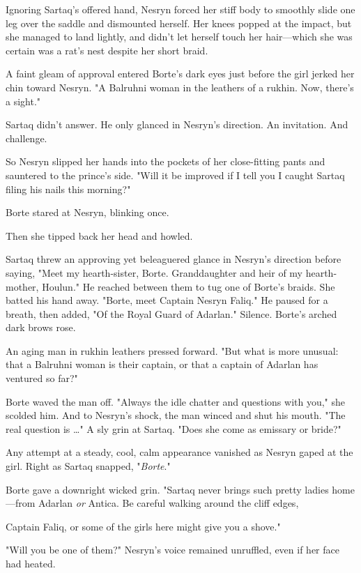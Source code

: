 Ignoring Sartaq's offered hand, Nesryn forced her stiff body to smoothly slide one leg over the saddle and dismounted herself.
Her knees popped at the impact, but she managed to land lightly, and didn't let herself touch her hair---which she was certain was a rat's nest despite her short braid.

A faint gleam of approval entered Borte's dark eyes just before the girl jerked her chin toward Nesryn.
"A Balruhni woman in the leathers of a rukhin.
Now, there's a sight."

Sartaq didn't answer.
He only glanced in Nesryn's direction.
An invitation.
And challenge.

So Nesryn slipped her hands into the pockets of her close-fitting pants and sauntered to the prince's side.
"Will it be improved if I tell you I caught Sartaq filing his nails this morning?"

Borte stared at Nesryn, blinking once.

Then she tipped back her head and howled.

Sartaq threw an approving yet beleaguered glance in Nesryn's direction before saying, "Meet my hearth-sister, Borte.
Granddaughter and heir of my hearth-mother, Houlun."
He reached between them to tug one of Borte's braids.
She batted his hand away.
"Borte, meet Captain Nesryn Faliq."
He paused for a breath, then added, "Of the Royal Guard of Adarlan."
Silence.
Borte's arched dark brows rose.

An aging man in rukhin leathers pressed forward.
"But what is more unusual: that a Balruhni woman is their captain, or that a captain of Adarlan has ventured so far?"

Borte waved the man off.
"Always the idle chatter and questions with you," she scolded him.
And to Nesryn's shock, the man winced and shut his mouth.
"The real question is \ldots" A sly grin at Sartaq.
"Does she come as emissary or bride?"

Any attempt at a steady, cool, calm appearance vanished as Nesryn gaped at the girl.
Right as Sartaq snapped, "\emph{Borte}."

Borte gave a downright wicked grin.
"Sartaq never brings such pretty ladies home---from Adarlan \emph{or} Antica.
Be careful walking around the cliff edges,

Captain Faliq, or some of the girls here might give you a shove."

"Will you be one of them?"
Nesryn's voice remained unruffled, even if her face had heated.

